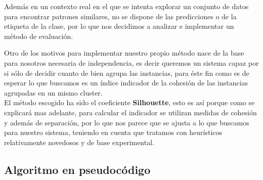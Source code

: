 \documentclass[10pt,a4paper]{article}
\begin{document}
Además en un contexto real en el que se intenta explorar un conjunto de datos para encontrar patrones similares, no se dispone de las predicciones o de la etiqueta de la clase, por lo que nos decidimos a analizar e implementar un método de evaluación.

Otro de los motivos para implementar nuestro propio método nace de la base para nosotros necesaria de independencia, es decir queremos un sistema capaz por si sólo de decidir cuanto de bien agrupa las instancias, para éste fin como es de esperar lo que buscamos es un índice indicador de la cohesión de las instancias agrupadas en un mismo cluster. \\

El método escogido ha sido el coeficiente \textbf{Silhouette}, esto es así porque como se explicará mas adelante, para calcular el indicador se utilizan medidas de cohesión y además de separación, por lo que nos parece que se ajusta a lo que buscamos para nuestro sistema, teniendo en cuenta que tratamos con heurísticos relativamente novedosos y de base experimental. \\


\newpage




\newpage

\subsection{Algoritmo en pseudocódigo}
\end{document}
